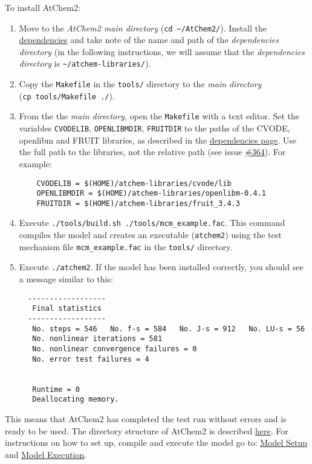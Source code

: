 To install AtChem2:

\begin{enumerate}
\item Move to the \emph{AtChem2 main directory} (\texttt{cd\
    \textasciitilde{}/AtChem2/}).  Install the
  \hyperref[sec:dependencies]{dependencies} and take note of the name
  and path of the \emph{dependencies directory} (in the following
  instructions, we will assume that the \emph{dependencies directory}
  is \texttt{\textasciitilde{}/atchem-libraries/}).
\item Copy the \texttt{Makefile} in the \texttt{tools/} directory to
  the \emph{main directory} (\texttt{cp\ tools/Makefile\ ./}).
\item From the the \emph{main directory}, open the \texttt{Makefile}
  with a text editor. Set the variables \texttt{CVODELIB},
  \texttt{OPENLIBMDIR}, \texttt{FRUITDIR} to the paths of the CVODE,
  openlibm and FRUIT libraries, as described in the
  \hyperref[sec:dependencies]{dependencies page}. Use the full path to
  the libraries, not the relative path (see issue
  \href{https://github.com/AtChem/AtChem2/issues/364}{\#364}). For
  example:
  \begin{verbatim}
    CVODELIB = $(HOME)/atchem-libraries/cvode/lib
    OPENLIBMDIR = $(HOME)/atchem-libraries/openlibm-0.4.1
    FRUITDIR = $(HOME)/atchem-libraries/fruit_3.4.3
\end{verbatim}
\item Execute \texttt{./tools/build.sh\
    ./tools/mcm\_example.fac}. This command compiles the model and
  creates an executable (\texttt{atchem2}) using the test mechanism
  file \texttt{mcm\_example.fac} in the \texttt{tools/} directory.
\item Execute \texttt{./atchem2}. If the model has been installed
  correctly, you should see a message similar to this:
\begin{verbatim}
  ------------------
   Final statistics
  ------------------
   No. steps = 546   No. f-s = 584   No. J-s = 912   No. LU-s = 56
   No. nonlinear iterations = 581
   No. nonlinear convergence failures = 0
   No. error test failures = 4


   Runtime = 0
   Deallocating memory.
\end{verbatim}
\end{enumerate}

This means that AtChem2 has completed the test run without errors and
is ready to be used. The directory structure of AtChem2 is described
\hyperref[sec:structure]{here}. For instructions on how to set up,
compile and execute the model go to: \hyperref[ch:setup]{Model Setup}
and \hyperref[ch:execution]{Model Execution}.

